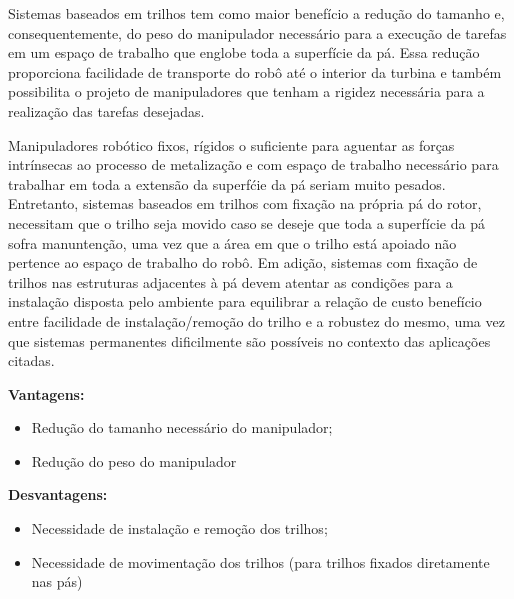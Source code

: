 Sistemas baseados em trilhos tem como maior benefício a redução do tamanho e,
consequentemente, do peso do manipulador necessário para a execução de tarefas
em um espaço de trabalho que englobe toda a superfície da pá.
Essa redução proporciona facilidade de transporte do robô até o interior da
turbina e também possibilita o projeto de manipuladores que tenham a rigidez
necessária para a realização das tarefas desejadas. 

Manipuladores robótico fixos, rígidos o suficiente para aguentar as forças intrínsecas ao
processo de metalização e com espaço de trabalho necessário para trabalhar em
toda a extensão da superfćie da pá seriam muito pesados.
Entretanto, sistemas baseados em trilhos com fixação na própria pá do rotor, necessitam que
o trilho seja movido caso se deseje que toda a superfície da pá sofra
manuntenção, uma vez que a área em que o trilho está apoiado não pertence ao espaço de
trabalho do robô. Em adição, sistemas com fixação de trilhos nas estruturas
adjacentes à pá devem atentar as condições para a instalação disposta pelo
ambiente para equilibrar a relação de custo benefício entre facilidade de
instalação/remoção do trilho e a robustez do mesmo, uma vez que sistemas
permanentes dificilmente são possíveis no contexto das aplicações citadas.

\textbf{Vantagens:}
\begin{itemize}
  \item Redução do tamanho necessário do manipulador;
  \item Redução do peso do manipulador
\end{itemize}

\textbf{Desvantagens:}
\begin{itemize}
  \item Necessidade de instalação e remoção dos trilhos;
  \item Necessidade de movimentação dos trilhos (para trilhos fixados
  diretamente nas pás)
\end{itemize}



